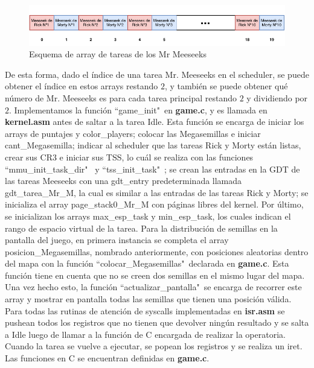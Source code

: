 \documentclass[a4paper]{article}
\begin{document}
\begin{figure}[h]
	\centering
	\includegraphics[scale=1.0]{img/TareasSinRickyMorty.pdf}
	\caption{Esquema de array de tareas de los Mr Meeseeks}
\end{figure}

\justify
De esta forma, dado el índice de una tarea Mr. Meeseeks en el scheduler, se puede obtener el índice en estos arrays restando $2$, y también se puede obtener qué número de Mr. Meeseeks es para cada tarea principal restando $2$ y dividiendo por $2$.
\justify
Implementamos la función ``game_init"\ en \textbf{game.c}, y es llamada en \textbf{kernel.asm} antes de saltar a la tarea Idle. Esta función se encarga de iniciar los arrays de puntajes y color_players; colocar las Megasemillas e iniciar cant_Megasemilla; indicar al scheduler que las tareas Rick y Morty están listas, crear sus CR3 e iniciar sus TSS, lo cuál se realiza con las funciones ``mmu_init_task_dir" \ y ``tss_init_task"\ ; se crean las entradas en la GDT de las tareas Meeseeks con una gdt_entry  predeterminada llamada gdt_tarea_Mr_M, la cual es similar a las entradas de las tareas Rick y Morty; se inicializa el array page_stack0_Mr_M con páginas libres del kernel. Por último, se inicializan los arrays max_esp_task y min_esp_task, los cuales indican el rango de espacio virtual de la tarea. 
\justify
Para la distribución de semillas en la pantalla del juego, en primera instancia se completa el array posicion_Megasemillas, nombrado anteriormente, con posiciones aleatorias dentro del mapa con la función ``colocar_Megasemillas"\ declarada en \textbf{game.c}. Esta función tiene en cuenta que no se creen dos semillas en el mismo lugar del mapa. Una vez hecho esto, la función ``actualizar_pantalla"\ se encarga de recorrer este array y mostrar en pantalla todas las semillas que tienen una posición válida.
\justify
Para todas las rutinas de atención de syscalls implementadas en \textbf{isr.asm} se pushean todos los registros que no tienen que devolver ningún resultado y se salta a Idle luego de llamar a la función de C encargada de realizar la operatoria. Cuando la tarea se vuelve a ejecutar, se popean los registros y se realiza un iret. Las funciones en C se encuentran definidas en \textbf{game.c}.
\justify
\end{document}
